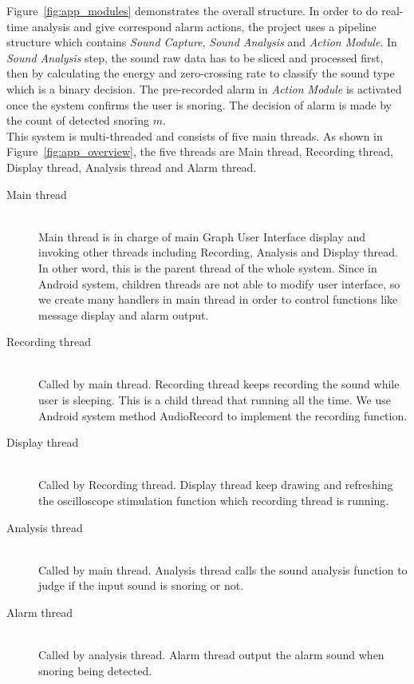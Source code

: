 \documentclass[conference]{IEEEtran}
\begin{document}
Figure~\ref{fig:app_modules} demonstrates the overall structure. In order to do real-time analysis and give correspond alarm actions, the project uses a pipeline structure which contains \emph{Sound Capture}, \emph{Sound Analysis} and \emph{Action Module}. In \emph{Sound Analysis} step, the sound raw data has to be sliced and processed first, then by calculating the energy and zero-crossing rate to classify the sound type which is a binary decision. The pre-recorded alarm in \emph{Action Module} is activated once the system confirms the user is snoring. The decision of alarm is made by the count of detected snoring \(m\). \\

This system is multi-threaded and consists of five main threads. As shown in Figure~\ref{fig:app_overview}, the five threads are Main thread, Recording thread, Display thread, Analysis thread and Alarm thread.\\
\begin{description}
  \item[Main thread] \hfill \\
  Main thread is in charge of main Graph User Interface display and invoking other threads including Recording, Analysis and Display thread. In other word, this is the parent thread of the whole system. Since in Android system, children threads are not able to modify user interface, so we create many handlers in main thread in order to control functions like message display and alarm output.
  \item[Recording thread] \hfill \\
  Called by main thread. Recording thread keeps recording the sound while user is sleeping. This is a child thread that running all the time. We use Android system method AudioRecord to implement the recording function.
  \item[Display thread] \hfill \\
  Called by Recording thread. Display thread keep drawing and refreshing the oscilloscope stimulation function which recording thread is running.
  \item[Analysis thread] \hfill \\
  Called by main thread. Analysis thread calls the sound analysis function to judge if the input sound is snoring or not.
  \item[Alarm thread] \hfill \\
  Called by analysis thread. Alarm thread output the alarm sound when snoring being detected.
\end{description}
\end{document}

